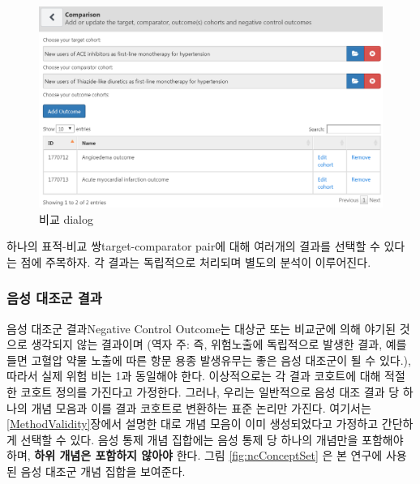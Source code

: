 \documentclass[10.5pt]{book}
\theoremstyle{definition}
\theoremstyle{definition}
\theoremstyle{definition}
\theoremstyle{remark}
\begin{document}
\begin{figure}

{\centering \includegraphics[width=1\linewidth]{images/PopulationLevelEstimation/comparisons} 

}

\caption{비교 dialog}\label{fig:comparisons}
\end{figure}

하나의 표적-비교 쌍target-comparator pair에 대해 여러개의 결과를 선택할
수 있다는 점에 주목하자. 각 결과는 독립적으로 처리되며 별도의 분석이
이루어진다.

\subsubsection*{음성 대조군 결과}\label{--}

음성 대조군 결과Negative Control Outcome는 대상군 또는 비교군에 의해
야기된 것으로 생각되지 않는 결과이며 (역자 주: 즉, 위험노출에 독립적으로
발생한 결과, 예를 들면 고혈압 약물 노출에 따른 항문 용종 발생유무는 좋은
음성 대조군이 될 수 있다.), 따라서 실제 위험 비는 1과 동일해야 한다.
이상적으로는 각 결과 코호트에 대해 적절한 코호트 정의를 가진다고
가정한다. 그러나, 우리는 일반적으로 음성 대조 결과 당 하나의 개념 모음과
이를 결과 코호트로 변환하는 표준 논리만 가진다. 여기서는
\ref{MethodValidity}장에서 설명한 대로 개념 모음이 이미 생성되었다고
가정하고 간단하게 선택할 수 있다. 음성 통제 개념 집합에는 음성 통제 당
하나의 개념만을 포함해야 하며, \textbf{하위 개념은 포함하지 않아야}
한다. 그림 \ref{fig:ncConceptSet} 은 본 연구에 사용된 음성 대조군 개념
집합을 보여준다.
\end{document}
